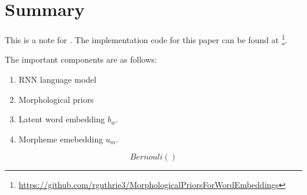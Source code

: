 \documentclass[11pt]{article}
\begin{document}
\section{Summary}

This is a note for \cite{bhatia-guthrie-eisenstein:2016:EMNLP2016}.
The implementation code for this paper can be found at \footnote{\url{https://github.com/rguthrie3/MorphologicalPriorsForWordEmbeddings}}.

The important components are as follows:
\begin{enumerate}
 \item RNN language model
 \item Morphological priors
 \item Latent word embedding $b_w$.
 \item Morpheme emebedding $u_m$.
\end{enumerate}


$$
Bernouli()
$$



\end{document}
